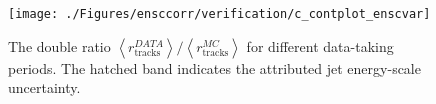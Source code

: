 \begin{figure}[ht]
	\centering
		\texttt{[image: ./Figures/ensccorr/verification/c\_contplot\_enscvar]} 
	\caption{The double ratio $\left\langle r^{DATA}_\text{tracks}\right\rangle/\left\langle r^{MC}_\text{tracks}\right\rangle$ for different data-taking periods. The hatched band indicates the attributed jet energy-scale uncertainty.}
	\label{fig:ratcalibcontrolplotunc1}
\end{figure}
